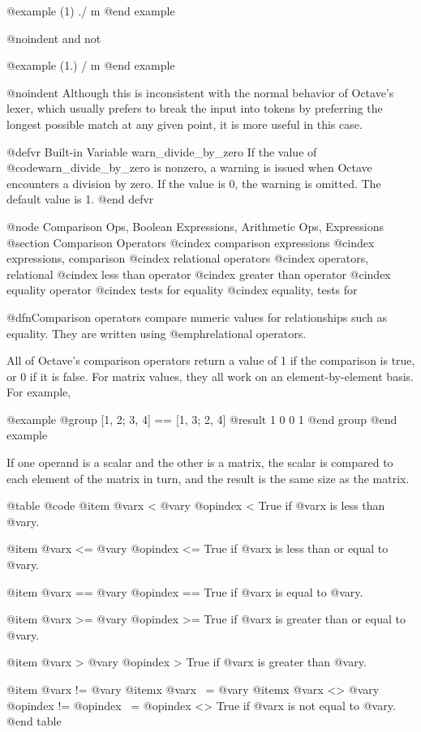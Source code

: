 @example
(1) ./ m
@end example

@noindent
and not

@example
(1.) / m
@end example

@noindent
Although this is inconsistent with the normal behavior of Octave's
lexer, which usually prefers to break the input into tokens by
preferring the longest possible match at any given point, it is more
useful in this case.

@defvr {Built-in Variable} warn_divide_by_zero
If the value of @code{warn_divide_by_zero} is nonzero, a warning
is issued when Octave encounters a division by zero.  If the value is
0, the warning is omitted.  The default value is 1.
@end defvr

@node Comparison Ops, Boolean Expressions, Arithmetic Ops, Expressions
@section Comparison Operators
@cindex comparison expressions
@cindex expressions, comparison
@cindex relational operators
@cindex operators, relational
@cindex less than operator
@cindex greater than operator
@cindex equality operator
@cindex tests for equality
@cindex equality, tests for

@dfn{Comparison operators} compare numeric values for relationships
such as equality.  They are written using
@emph{relational operators}.

All of Octave's comparison operators return a value of 1 if the
comparison is true, or 0 if it is false.  For matrix values, they all
work on an element-by-element basis.  For example,

@example
@group
[1, 2; 3, 4] == [1, 3; 2, 4]
     @result{}  1  0
         0  1
@end group
@end example

If one operand is a scalar and the other is a matrix, the scalar is
compared to each element of the matrix in turn, and the result is the
same size as the matrix.

@table @code
@item @var{x} < @var{y}
@opindex <
True if @var{x} is less than @var{y}.

@item @var{x} <= @var{y}
@opindex <=
True if @var{x} is less than or equal to @var{y}.

@item @var{x} == @var{y}
@opindex ==
True if @var{x} is equal to @var{y}.

@item @var{x} >= @var{y}
@opindex >=
True if @var{x} is greater than or equal to @var{y}.

@item @var{x} > @var{y}
@opindex >
True if @var{x} is greater than @var{y}.

@item @var{x} != @var{y}
@itemx @var{x} ~= @var{y}
@itemx @var{x} <> @var{y}
@opindex !=
@opindex ~=
@opindex <>
True if @var{x} is not equal to @var{y}.
@end table

